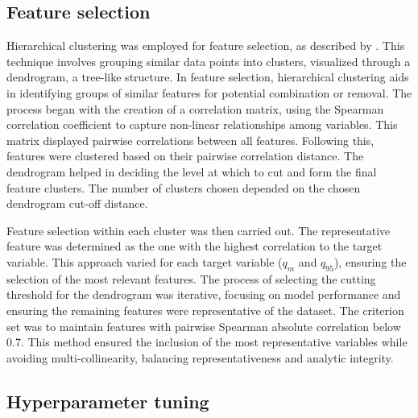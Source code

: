 \documentclass[12pt]{article}
\begin{document}
\subsection{Feature selection} \label{sec:methods:selection}

\par Hierarchical clustering was employed for feature selection, as described by \cite{johnson1967}. This technique involves grouping similar data points into clusters, visualized through a dendrogram, a tree-like structure. In feature selection, hierarchical clustering aids in identifying groups of similar features for potential combination or removal. The process began with the creation of a correlation matrix, using the Spearman correlation coefficient to capture non-linear relationships among variables. This matrix displayed pairwise correlations between all features. Following this, features were clustered based on their pairwise correlation distance. The dendrogram helped in deciding the level at which to cut and form the final feature clusters. The number of clusters chosen depended on the chosen dendrogram cut-off distance.

\par Feature selection within each cluster was then carried out. The representative feature was determined as the one with the highest correlation to the target variable. This approach varied for each target variable (\( q_{m} \) and \( q_{95} \)), ensuring the selection of the most relevant features. The process of selecting the cutting threshold for the dendrogram was iterative, focusing on model performance and ensuring the remaining features were representative of the dataset. The criterion set was to maintain features with pairwise Spearman absolute correlation below 0.7. This method ensured the inclusion of the most representative variables while avoiding multi-collinearity, balancing representativeness and analytic integrity.

\subsection{Hyperparameter tuning} \label{sec:methods:tuning}
\end{document}
